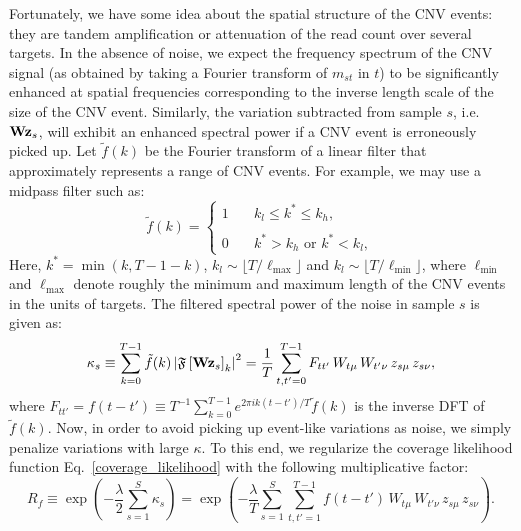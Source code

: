 \documentclass[nofootinbib,amssymb,amsmath]{revtex4}
\newcommand{\vz}{{\bf z}}
\newcommand{\vW}{{\bf W}}
\begin{document}
 Fortunately, we have some idea about the spatial structure of the CNV events: they are tandem amplification or attenuation of the read count over several targets. In the absence of noise, we expect the frequency spectrum of the CNV signal (as obtained by taking a Fourier transform of $m_{st}$ in $t$) to be significantly enhanced at spatial frequencies corresponding to the inverse length scale of the size of the CNV event. Similarly, the variation subtracted from sample $s$, i.e. $\vW \vz_s$, will exhibit an enhanced spectral power if a CNV event is erroneously picked up. Let $\tilde{f}(k)$ be the Fourier transform of a linear filter that approximately represents a range of CNV events. For example, we may use a midpass filter such as:
\begin{equation}
\tilde{f}(k) = \left\{
\begin{array}{ll}
  1 & \quad k_l \leq k^* \leq k_h,\\
  \\
  0 & \quad k^* > k_h \,\, \text{or} \,\, k^* < k_l,
\end{array}
\right.
\end{equation}
Here, $k^* = \min(k, T - 1 - k)$, $k_l \sim \lfloor T / \ell_\mathrm{max} \rfloor$ and $k_l \sim \lfloor T / \ell_\mathrm{min} \rfloor$, where $\ell_\mathrm{min}$ and $\ell_\mathrm{max}$ denote roughly the minimum and maximum length of the CNV events in the units of targets. The filtered spectral power of the noise in sample $s$ is given as:
\begin{equation}
\kappa_s \equiv \sum_{k=0}^{T-1} \tilde{f}(k) \left|\mathfrak{F}\left[\vW \vz_s\right]_k\right|^2 = \frac{1}{T}\sum_{t,t'=0}^{T-1}F_{tt'} \, W_{t\mu} \, W_{t'\nu} \, z_{s\mu} \, z_{s\nu},
\end{equation}
where $F_{tt'} = f(t-t') \equiv T^{-1} \sum_{k=0}^{T-1} e^{2\pi i k (t-t')/T} \tilde{f}(k)$ is the inverse DFT of $\tilde{f}(k)$. Now, in order to avoid picking up event-like variations as noise, we simply penalize variations with large $\kappa$. To this end, we regularize the coverage likelihood function Eq.~\eqref{coverage_likelihood} with the following multiplicative factor:
\begin{equation}
R_f \equiv \exp\left(-\frac{\lambda}{2} \sum_{s=1}^S\kappa_s\right) = \exp\left(-\frac{\lambda}{T}\sum_{s=1}^S\sum_{t,t'=1}^{T-1}f(t-t') \, W_{t\mu} \, W_{t'\nu} \, z_{s\mu} \, z_{s\nu}\right).
\end{equation}
\end{document}
